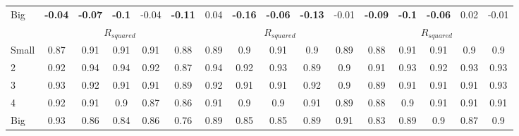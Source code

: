 \begin{table}[H]
\begin{tabular}{lccccc|ccccc|ccccc}
Big & \textbf{-0.04} & \textbf{-0.07} & \textbf{-0.1} & -0.04 & \textbf{-0.11} & 0.04 & \textbf{-0.16} & \textbf{-0.06} & \textbf{-0.13} & -0.01 & \textbf{-0.09} & \textbf{-0.1} & \textbf{-0.06} & 0.02 & -0.01 \\
 & \multicolumn{5}{c|}{$R_{squared}$} & \multicolumn{5}{c|}{$R_{squared}$} & \multicolumn{5}{c}{$R_{squared}$} \\
Small & 0.87 & 0.91 & 0.91 & 0.91 & 0.88 & 0.89 & 0.9 & 0.91 & 0.9 & 0.89 & 0.88 & 0.91 & 0.91 & 0.9 & 0.9 \\
2 & 0.92 & 0.94 & 0.94 & 0.92 & 0.87 & 0.94 & 0.92 & 0.93 & 0.89 & 0.9 & 0.91 & 0.93 & 0.92 & 0.93 & 0.93 \\
3 & 0.93 & 0.92 & 0.91 & 0.91 & 0.89 & 0.92 & 0.91 & 0.91 & 0.92 & 0.9 & 0.89 & 0.91 & 0.91 & 0.91 & 0.93 \\
4 & 0.92 & 0.91 & 0.9 & 0.87 & 0.86 & 0.91 & 0.9 & 0.9 & 0.91 & 0.89 & 0.88 & 0.9 & 0.91 & 0.91 & 0.91 \\
Big & 0.93 & 0.86 & 0.84 & 0.86 & 0.76 & 0.89 & 0.85 & 0.85 & 0.89 & 0.91 & 0.83 & 0.89 & 0.9 & 0.87 & 0.9 \\
\end{tabular}
\end{table}
